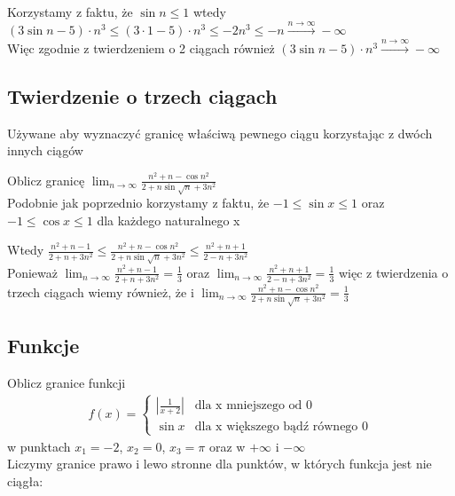 \documentclass[12pt]{article}
\begin{document}
	\noindent Korzystamy z faktu, że $\sin{n} \leq 1$ wtedy \\
	$(3 \sin{n} - 5) \cdot n^{3}  \leq  (3\cdot 1 - 5) \cdot n^{3}  \leq  -2n^{3}  \leq  -n \stackrel{n \to \infty}{\longrightarrow} -\infty$ \\
	Więc zgodnie z twierdzeniem o 2 ciągach również $(3 \sin{n} - 5) \cdot n^{3} \stackrel{n \to \infty}{\longrightarrow} -\infty$

	\subsection{Twierdzenie o trzech ciągach}

	Używane aby wyznaczyć granicę właściwą pewnego ciągu korzystając z dwóch innych ciągów

	\noindent Oblicz granicę $\lim_{n\to \infty}{\frac{n^2+n-\cos{n^2}}{2+n\sin{\sqrt{n}}+3n^2}}$ \\

	\noindent Podobnie jak poprzednio korzystamy z faktu, że $-1 \leq \sin{x} \leq 1$ oraz $-1 \leq \cos{x} \leq 1$ dla każdego naturalnego x

	\noindent Wtedy $\frac{n^2+n-1}{2+n+3n^2} \leq \frac{n^2+n- \cos{n^2}}{2+n \sin{\sqrt{n}}+3n^2} \leq \frac{n^2+n+1}{2-n+3n^2}$ \\

	\noindent Ponieważ $\lim_{n\to \infty} \frac{n^2+n-1}{2+n+3n^2} = \frac{1}{3}$ oraz $\lim_{n\to \infty} \frac{n^2+n+1}{2-n+3n^2} = \frac{1}{3}$
	więc z twierdzenia o trzech ciągach wiemy również, że i $\lim_{n\to \infty}{\frac{n^2+n-\cos{n^2}}{2+n\sin{\sqrt{n}}+3n^2}} = \frac{1}{3}$


	\subsection{Funkcje}

	Oblicz granice funkcji 
	\begin{align*} f(x) = 
	\begin{cases}
		|\frac{1}{x+2}| & \text{dla x mniejszego od 0} \\
		\sin{x} & \text{dla x większego bądź równego 0}
	\end{cases}
	\end{align*}
	w punktach $x_{1} = -2$, $x_{2} = 0$, $x_{3} = \pi$ oraz w $+\infty$ i $-\infty$ \\

	\noindent Liczymy granice prawo i lewo stronne dla punktów, w których funkcja jest nie ciągła: \\
\end{document}
